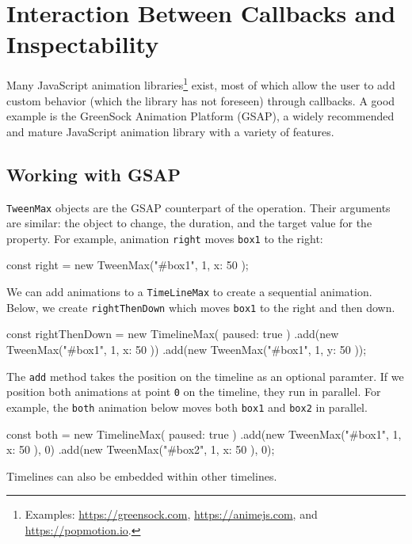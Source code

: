 \section{Interaction Between Callbacks and Inspectability}
\label{sec:evaluation}

Many JavaScript animation libraries\footnote{Examples:
\url{https://greensock.com}, \url{https://animejs.com}, and
\url{https://popmotion.io}.} exist, most of which allow the user to add custom
behavior (which the library has not foreseen) through callbacks. A good example
is the GreenSock Animation Platform (GSAP), a widely recommended and mature
JavaScript animation library with a variety of features.

\subsection{Working with GSAP}

\texttt{TweenMax} objects are the GSAP counterpart of the
 operation. Their arguments are similar: the object to change, the
duration, and the target value for the
property. For example, animation \texttt{right} moves
\texttt{box1} to the right:

\begin{js}
const right = new TweenMax("#box1", 1, { x: 50 });
\end{js}

We can add animations to a \texttt{TimeLineMax} to create a sequential animation. Below, we create  \texttt{rightThenDown} which moves \texttt{box1} to the right and then down.

\begin{js}
const rightThenDown = new TimelineMax({ paused: true })
  .add(new TweenMax("#box1", 1, { x: 50 }))
  .add(new TweenMax("#box1", 1, { y: 50 }));
\end{js}


The \texttt{add} method takes the position on the timeline as an optional
paramter. If we position both animations at point \texttt{0} on the timeline,
they run in parallel. For example, the \texttt{both} animation below 
moves both \texttt{box1} and \texttt{box2} in parallel.

\begin{js}
const both = new TimelineMax({ paused: true })
  .add(new TweenMax("#box1", 1, { x: 50 }), 0)
  .add(new TweenMax("#box2", 1, { x: 50 }), 0);
\end{js}

Timelines can also be embedded within other timelines.

